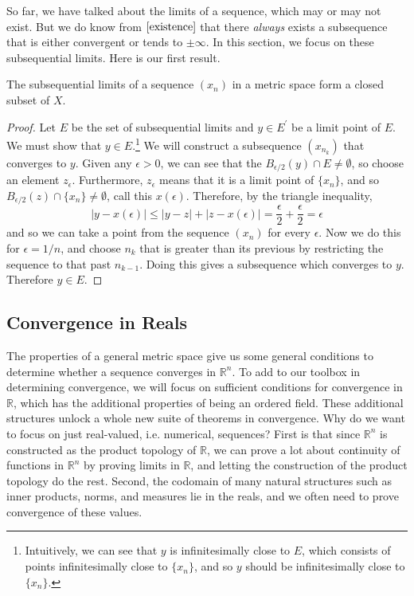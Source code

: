   So far, we have talked about the limits of a sequence, which may or may not exist. But we do know from $\ref{existence}$ that there \textit{always} exists a subsequence that is either convergent or tends to $\pm \infty$. In this section, we focus on these subsequential limits. Here is our first result. 

  \begin{theorem}
    The subsequential limits of a sequence $(x_n)$ in a metric space form a closed subset of $X$. 
  \end{theorem}
  \begin{proof}
    Let $E$ be the set of subsequential limits and $y \in E^\prime$ be a limit point of $E$. We must show that $y \in E$.\footnote{Intuitively, we can see that $y$ is infinitesimally close to $E$, which consists of points infinitesimally close to $\{x_n\}$, and so $y$ should be infinitesimally close to $\{x_n\}$.} We will construct a subsequence $(x_{n_k})$ that converges to $y$. Given any $\epsilon > 0$, we can see that the $B_{\epsilon/2} (y) \cap E \neq \emptyset$, so choose an element $z_\epsilon$. Furthermore, $z_\epsilon$ means that it is a limit point of $\{x_n\}$, and so $B_{\epsilon/2} (z) \cap \{x_n\} \neq \emptyset$, call this $x(\epsilon)$. Therefore, by the triangle inequality, 
    \begin{equation}
      |y - x(\epsilon)| \leq |y - z| + |z - x(\epsilon)| = \frac{\epsilon}{2} + \frac{\epsilon}{2} = \epsilon
    \end{equation}
    and so we can take a point from the sequence $(x_n)$ for every $\epsilon$. Now we do this for $\epsilon = 1/n$, and choose $n_k$ that is greater than its previous by restricting the sequence to that past $n_{k-1}$. Doing this gives a subsequence which converges to $y$. Therefore $y \in E$. 
  \end{proof}

\subsection{Convergence in Reals}

  The properties of a general metric space give us some general conditions to determine whether a sequence converges in $\mathbb{R}^n$. To add to our toolbox in determining convergence, we will focus on sufficient conditions for convergence in $\mathbb{R}$, which has the additional properties of being an ordered field. These additional structures unlock a whole new suite of theorems in convergence. Why do we want to focus on just real-valued, i.e. numerical, sequences? First is that since $\mathbb{R}^n$ is constructed as the product topology of $\mathbb{R}$, we can prove a lot about continuity of functions in $\mathbb{R}^n$ by proving limits in $\mathbb{R}$, and letting the construction of the product topology do the rest. Second, the codomain of many natural structures such as inner products, norms, and measures lie in the reals, and we often need to prove convergence of these values. 

